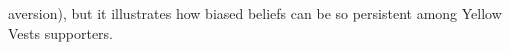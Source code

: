 \documentclass[11pt]{article}
\begin{document}
aversion), but it illustrates how biased beliefs can be so persistent among Yellow Vests supporters. 


\end{document}
